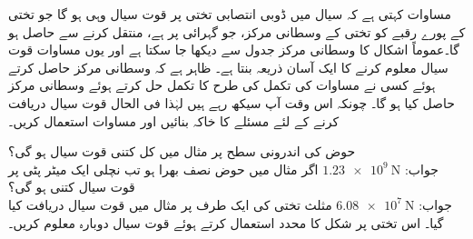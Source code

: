 
مساوات  کہتی ہے کہ سیال میں ڈوبی انتصابی تختی پر قوت سیال وہی ہو گا جو تختی کے پورے رقبے کو تختی کے وسطانی مرکز، جو  گہرائی پر ہے، منتقل کرنے سے  حاصل ہو گا۔عموماً اشکال کا وسطانی مرکز جدول سے دیکھا جا سکتا ہے اور یوں مساوات  قوت سیال معلوم کرنے کا ایک آسان ذریعہ بنتا ہے۔ ظاہر ہے کہ وسطانی مرکز حاصل کرتے ہوئے کسی نے   مساوات  کی تکمل کی طرح کا تکمل حل کرتے ہوئے وسطانی مرکز حاصل کیا ہو گا۔ چونکہ اس وقت آپ سیکھ رہے ہیں لہٰذا فی الحال قوت سیال دریافت کرنے کے لئے مسئلے کا خاکہ بنائیں اور مساوات  استعمال کریں۔

حوض کی اندرونی سطح  پر مثال  میں  کل کتنی قوت سیال  ہو گی؟\\
جواب:\quad
$\SI{1.23e9}{\newton}$
اگر مثال  میں حوض نصف بھرا ہو تب نچلی ایک میٹر پٹی پر قوت سیال کتنی ہو گی؟\\
جواب:\quad
$\SI{6.08e7}{\newton}$
مثلث تختی کی ایک طرف پر مثال  میں قوت سیال دریافت کیا گیا۔ اس تختی پر شکل  کا محدد استعمال کرتے ہوئے قوت سیال دوبارہ معلوم کریں۔ 
